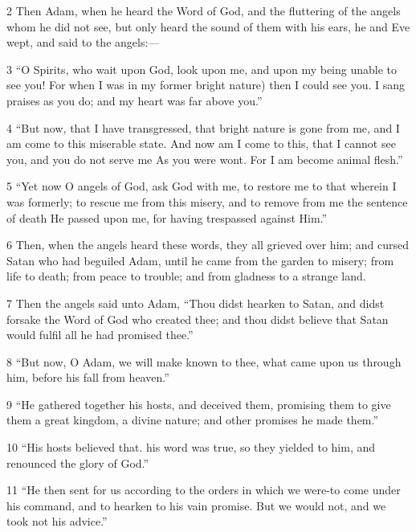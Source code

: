\par 2 Then Adam, when he heard the Word of God, and the fluttering of the angels whom he did not see, but only heard the sound of them with his ears, he and Eve wept, and said to the angels:—

\par 3 “O Spirits, who wait upon God, look upon me, and upon my being unable to see you! For when I was in my former bright nature) then I could see you. I sang praises as you do; and my heart was far above you.”

\par 4 “But now, that I have transgressed, that bright nature is gone from me, and I am come to this miserable state. And now am I come to this, that I cannot see you, and you do not serve me As you were wont. For I am become animal flesh.”

\par 5 “Yet now O angels of God, ask God with me, to restore me to that wherein I was formerly; to rescue me from this misery, and to remove from me the sentence of death He passed upon me, for having trespassed against Him.”

\par 6 Then, when the angels heard these words, they all grieved over him; and cursed Satan who had beguiled Adam, until he came from the garden to misery; from life to death; from peace to trouble; and from gladness to a strange land.

\par 7 Then the angels said unto Adam, “Thou didst hearken to Satan, and didst forsake the Word of God who created thee; and thou didst believe that Satan would fulfil all he had promised thee.”

\par 8 “But now, O Adam, we will make known to thee, what came upon us through him, before his fall from heaven.”

\par 9 “He gathered together his hosts, and deceived them, promising them to give them a great kingdom, a divine nature; and other promises he made them.”

\par 10 “His hosts believed that. his word was true, so they yielded to him, and renounced the glory of God.”

\par 11 “He then sent for us according to the orders in which we were-to come under his command, and to hearken to his vain promise. But we would not, and we took not his advice.”

